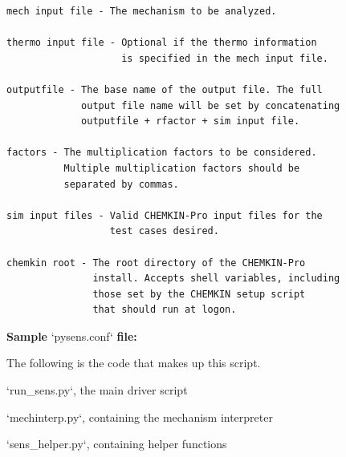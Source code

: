 \documentclass[12pt,letterpaper,oneside,draft]{book}
\begin{document}
\begin{appendices}
\begin{singlespace}
{\begin{Verbatim}
mech input file - The mechanism to be analyzed.

thermo input file - Optional if the thermo information
                    is specified in the mech input file.

outputfile - The base name of the output file. The full
             output file name will be set by concatenating
             outputfile + rfactor + sim input file.

factors - The multiplication factors to be considered.
          Multiple multiplication factors should be
          separated by commas.

sim input files - Valid CHEMKIN-Pro input files for the
                  test cases desired.

chemkin root - The root directory of the CHEMKIN-Pro
               install. Accepts shell variables, including
               those set by the CHEMKIN setup script
               that should run at logon.
\end{Verbatim}

{\large \textbf{Sample} `pysens.conf` \textbf{file:}}

The following is the code that makes up this script.

\cleardoublepage

{\Large `run\_sens.py`, the main driver script}


\cleardoublepage

{\Large `mechinterp.py`, containing the mechanism interpreter}


\cleardoublepage

{\Large `sens\_helper.py`, containing helper functions}

}
\end{singlespace}
\end{appendices}
\end{document}
